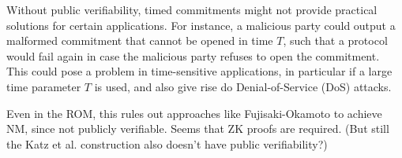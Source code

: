 Without public verifiability, timed commitments might not provide practical solutions for certain applications. For instance, a malicious party could output a malformed commitment that cannot be opened in time $T$, such that a protocol would fail again in case the malicious party refuses to open the commitment. This could pose a problem in time-sensitive applications, in particular if a large time parameter $T$ is used, and also give rise do Denial-of-Service (DoS) attacks.



Even in the ROM, this rules out approaches like Fujisaki-Okamoto to achieve NM, since not publicly verifiable. Seems that ZK proofs are required. (But still the Katz et al. construction also doesn't have public verifiability?)






